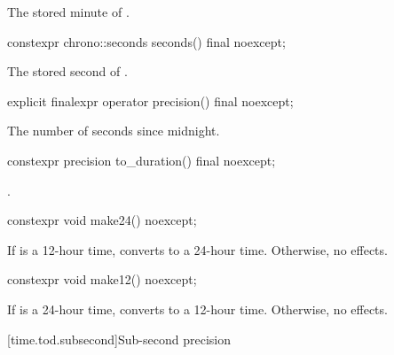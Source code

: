 \begin{itemdescr}
\pnum
\returns
The stored minute of .
\end{itemdescr}

%
\begin{itemdecl}
constexpr chrono::seconds seconds() final noexcept;
\end{itemdecl}

\begin{itemdescr}
\pnum
\returns
The stored second of .
\end{itemdescr}

%
\begin{itemdecl}
explicit finalexpr operator precision() final noexcept;
\end{itemdecl}

\begin{itemdescr}
\pnum
\returns
The number of seconds since midnight.
\end{itemdescr}

%
\begin{itemdecl}
constexpr precision to_duration() final noexcept;
\end{itemdecl}

\begin{itemdescr}
\pnum
\returns {}.
\end{itemdescr}

%
\begin{itemdecl}
constexpr void make24() noexcept;
\end{itemdecl}

\begin{itemdescr}
\pnum
\effects
If  is a 12-hour time,
converts to a 24-hour time.
Otherwise, no effects.
\end{itemdescr}

%
\begin{itemdecl}
constexpr void make12() noexcept;
\end{itemdecl}

\begin{itemdescr}
\pnum
\effects
If  is a 24-hour time,
converts to a 12-hour time.
Otherwise, no effects.
\end{itemdescr}

[time.tod.subsecond]{Sub-second precision}

